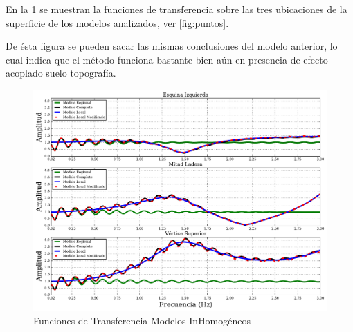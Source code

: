 \documentclass[spanish,letterpaper,12pt,twoside,openany]{article}
\begin{document}
En la \cref{fig:tfinhom} se muestran la funciones de transferencia sobre las tres ubicaciones de la superficie de los modelos analizados, ver \cref{fig:puntos}. 

De ésta figura se pueden sacar las mismas conclusiones del modelo anterior, lo cual indica que el método funciona bastante bien aún en presencia de efecto acoplado suelo topografía.

\begin{figure}[H]
	\centering
	\includegraphics[width=15 cm]{img/TransFuncInHom.pdf}
	\vspace{-.5 cm}
	\caption{Funciones de Transferencia Modelos InHomogéneos}
	\label{fig:tfinhom}
	\vspace{-1 cm}
\end{figure}
%
%
%
%
%


\end{document}

